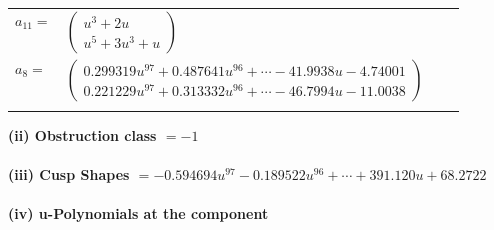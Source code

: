 \documentclass[1p]{elsarticle_modified}
\theoremstyle{definition}
\begin{document}
\begin{tabular}{m{7pt} m{180pt} m{7pt} m{180pt} }
\flushright $a_{11}=$&$\begin{pmatrix}u^3+2 u\\u^5+3 u^3+u\end{pmatrix}$ \\
\flushright $a_{8}=$&$\begin{pmatrix}0.299319 u^{97}+0.487641 u^{96}+\cdots-41.9938 u-4.74001\\0.221229 u^{97}+0.313332 u^{96}+\cdots-46.7994 u-11.0038\end{pmatrix}$\\&\end{tabular}
\flushleft \textbf{(ii) Obstruction class $= -1$}\\~\\
\flushleft \textbf{(iii) Cusp Shapes $= -0.594694 u^{97}-0.189522 u^{96}+\cdots+391.120 u+68.2722$}\\~\\
\newpage\renewcommand{\arraystretch}{1}
\flushleft \textbf{(iv) u-Polynomials at the component}\newline \\
\end{document}
